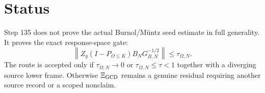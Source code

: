 \documentclass[11pt]{article}
\begin{document}
\section{Status}
Step 135 does not prove the actual Burnol/Müntz seed estimate in full generality.  It proves the exact response-space gate:
\[
   \boxed{
   \left\|Z_y(I-P_{\Omega\le K})B_NG_{B,N}^{-1/2}\right\|\le \tau_{\Omega,N}.
   }
\]
The route is accepted only if $\tau_{\Omega,N}\to0$ or $\tau_{\Omega,N}\le\tau<1$ together with a diverging source lower frame.  Otherwise $\Xi_{\rm GCD}$ remains a genuine residual requiring another source record or a scoped nonclaim.
\end{document}
